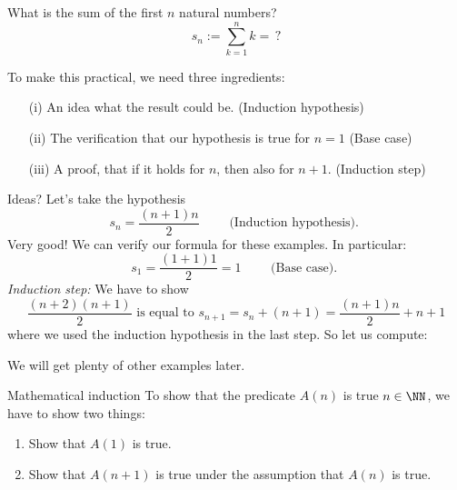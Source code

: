 \begin{example}
What is the sum of the first $n$ natural numbers?
\[
 s_n := \sum_{k=1}^n k = \,?
\]


To make this practical, we need three ingredients:
\begin{itemize}
 \item[(i)] An idea what the result could be. (Induction hypothesis)
 \item[(ii)] The verification that our hypothesis is true for $n=1$ (Base case)
 \item[(iii)] A proof, that if it holds for $n$, then also for $n+1$. (Induction step)
\end{itemize}
Ideas? Let's take the hypothesis
\[
 s_n = \frac{(n+1)n}{2}\qquad  \mbox{ (Induction hypothesis). }
\]
Very good! We can verify our formula for these examples. In particular:
\[
 s_1 = \frac{(1+1)1}{2}=1 \qquad  \mbox{ (Base case). }
\]
\emph{Induction step:} We have to show
\[
 \frac{(n+2)(n+1)}{2} \mbox{ is equal to } s_{n+1}=s_n + (n+1)
 = \frac{(n+1)n}{2}+n+1
\]
where we used the induction hypothesis in the last step.
So let us compute:
\end{example}


We will get plenty of other examples later. 

\begin{Faust}{Mathematical induction}
 To show that the predicate $A(n)$ is true  $n \in \NN$,
 we have to show two things:
 	\begin{enumerate}[(1)]
 		\item Show that $A(1)$ is true.
 		\item Show that $A(n+1)$ is true under the assumption that $A(n)$
 		is true.
 	\end{enumerate}
\end{Faust}

